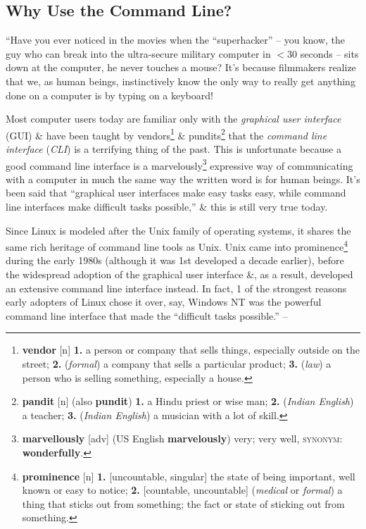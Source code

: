 \documentclass[oneside]{book}
\numberwithin{equation}{section}
\begin{document}
\subsection*{Why Use the Command Line?}
``Have you ever noticed in the movies when the ``superhacker'' -- you know, the guy who can break into the ultra-secure military computer in $< 30$ seconds -- sits down at the computer, he never touches a mouse? It's because filmmakers realize that we, as human beings, instinctively know the only way to really get anything done on a computer is by typing on a keyboard!

Most computer users today are familiar only with the \textit{graphical user interface} (GUI) \& have been taught by vendors\footnote{\textbf{vendor} [n] \textbf{1.} a person or company that sells things, especially outside on the street; \textbf{2.} (\textit{formal}) a company that sells a particular product; \textbf{3.} (\textit{law}) a person who is selling something, especially a house.} \& pundits\footnote{\textbf{pandit} [n] (also \textbf{pundit}) \textbf{1.} a Hindu priest or wise man; \textbf{2.} (\textit{Indian English}) a teacher; \textbf{3.} (\textit{Indian English}) a musician with a lot of skill.} that the \textit{command line interface} (\textit{CLI}) is a terrifying thing of the past. This is unfortunate because a good command line interface is a marvelously\footnote{\textbf{marvellously} [adv] (US English \textbf{marvelously}) very; very well, \textsc{synonym}: \textbf{wonderfully}.} expressive way of communicating with a computer in much the same way the written word is for human beings. It's been said that ``graphical user interfaces make easy tasks easy, while command line interfaces make difficult tasks possible,'' \& this is still very true today.

Since Linux is modeled after the Unix family of operating systems, it shares the same rich heritage of command line tools as Unix. Unix came into prominence\footnote{\textbf{prominence} [n] \textbf{1.} [uncountable, singular] the state of being important, well known or easy to notice; \textbf{2.} [countable, uncountable] (\textit{medical} or \textit{formal}) a thing that sticks out from something; the fact or state of sticking out from something.} during the early 1980s (although it was 1st developed a decade earlier), before the widespread adoption of the graphical user interface \&, as a result, developed an extensive command line interface instead. In fact, 1 of the strongest reasons early adopters of Linux chose it over, say, Windows NT was the powerful command line interface that made the ``difficult tasks possible.'' -- \cite[p. 31]{Shotts2019}
\end{document}
